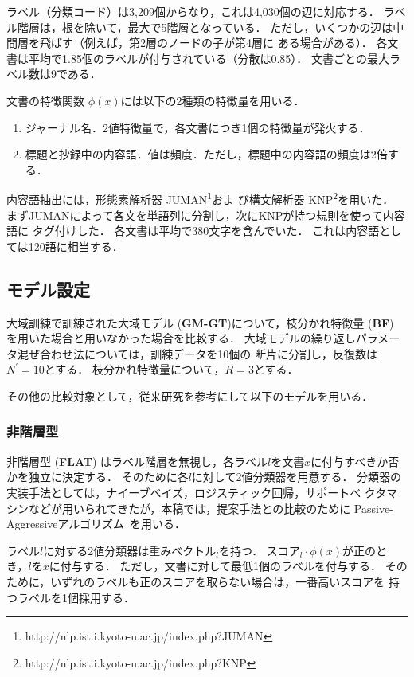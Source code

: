 \documentclass[japanese]{jnlp_1.4}
\newcommand{\vect}[1]{}
\begin{document}
ラベル（分類コード）は3,209個からなり，これは4,030個の辺に対応する．
ラベル階層は，根を除いて，最大で5階層となっている．
ただし，いくつかの辺は中間層を飛ばす（例えば，第2層のノードの子が第4層に
ある場合がある）．
各文書は平均で1.85個のラベルが付与されている（分散は0.85）．
文書ごとの最大ラベル数は9である．

文書の特徴関数 $\phi(x)$には以下の2種類の特徴量を用いる．
\begin{enumerate}
 \item ジャーナル名．2値特徴量で，各文書につき1個の特徴量が発火する．
 \item 標題と抄録中の内容語．値は頻度．ただし，標題中の内容語の頻度は2倍する．
\end{enumerate}
内容語抽出には，形態素解析器
JUMAN\footnote{http://nlp.ist.i.kyoto-u.ac.jp/index.php?JUMAN}およ
び構文解析器
KNP\footnote{http://nlp.ist.i.kyoto-u.ac.jp/index.php?KNP}を用いた．
まずJUMANによって各文を単語列に分割し，次にKNPが持つ規則を使って内容語に
タグ付けした．
各文書は平均で380文字を含んでいた．
これは内容語としては120語に相当する．


\subsection{モデル設定}
\label{sec:experiments-model}

大域訓練で訓練された大域モデル ({\bf GM-GT})について，枝分かれ特徴量
({\bf BF}) を用いた場合と用いなかった場合を比較する．
大域モデルの繰り返しパラメータ混ぜ合わせ法については，訓練データを10個の
断片に分割し，反復数は$N^\prime=10$とする．
枝分かれ特徴量について，$R=3$とする．

その他の比較対象として，従来研究を参考にして以下のモデルを用いる．


\subsubsection{非階層型}
\label{sec:experiments-model-flat}

非階層型 ({\bf FLAT}) はラベル階層を無視し，各ラベル$l$を文書$x$に付与すべきか否
かを独立に決定する．
そのために各$l$に対して2値分類器を用意する．
分類器の実装手法としては，ナイーブベイズ，ロジスティック回帰，サポートベ
クタマシンなどが用いられてきたが，本稿では，提案手法との比較のために
Passive-Aggressiveアルゴリズム~\cite{Crammer2006}を用いる．

ラベル$l$に対する2値分類器は重みベクトル$\vect{w}_{l}$を持つ．
スコア$\vect{w}_{l} \cdot \phi(x)$が正のとき，$l$を$x$に付与する．
ただし，文書に対して最低1個のラベルを付与する．
そのために，いずれのラベルも正のスコアを取らない場合は，一番高いスコアを
持つラベルを1個採用する．
\end{document}
